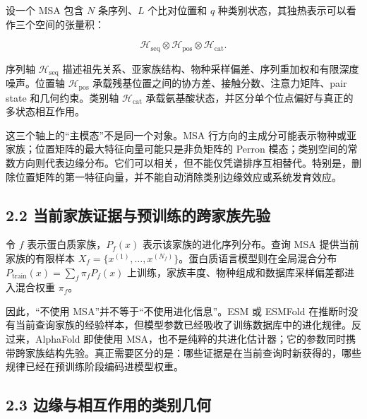 \documentclass[10pt]{article}
\begin{document}

设一个 MSA 包含 \(N\) 条序列、\(L\) 个比对位置和 \(q\) 种类别状态，其独热表示可以看作三个空间的张量积：\par


\begin{equation}
\mathcal H_{\mathrm{seq}}\otimes
\mathcal H_{\mathrm{pos}}\otimes
\mathcal H_{\mathrm{cat}}.
\end{equation}

序列轴 \(\mathcal H_{\mathrm{seq}}\) 描述祖先关系、亚家族结构、物种采样偏差、序列重加权和有限深度噪声。位置轴 \(\mathcal H_{\mathrm{pos}}\) 承载残基位置之间的协方差、接触分数、注意力矩阵、pair state 和几何约束。类别轴 \(\mathcal H_{\mathrm{cat}}\) 承载氨基酸状态，并区分单个位点偏好与真正的多状态相互作用。\par

这三个轴上的“主模态”不是同一个对象。MSA 行方向的主成分可能表示物种或亚家族；位置矩阵的最大特征向量可能只是非负矩阵的 Perron 模态；类别空间的常数方向则代表边缘分布。它们可以相关，但不能仅凭谱排序互相替代。特别是，删除位置矩阵的第一特征向量，并不能自动消除类别边缘效应或系统发育效应。\par

\subsection*{2.2 当前家族证据与预训练的跨家族先验}


令 \(f\) 表示蛋白质家族，\(P_f(x)\) 表示该家族的进化序列分布。查询 MSA 提供当前家族的有限样本 \(X_f=\{x^{(1)},\ldots,x^{(N_f)}\}\)。蛋白质语言模型则在全局混合分布 \(P_{\mathrm{train}}(x)=\sum_f\pi_fP_f(x)\) 上训练，家族丰度、物种组成和数据库采样偏差都进入混合权重 \(\pi_f\)。\par

因此，“不使用 MSA”并不等于“不使用进化信息”。ESM 或 ESMFold 在推断时没有当前查询家族的经验样本，但模型参数已经吸收了训练数据库中的进化规律。反过来，AlphaFold 即使使用 MSA，也不是纯粹的共进化估计器；它的参数同时携带跨家族结构先验。真正需要区分的是：哪些证据是在当前查询时新获得的，哪些规律已经在预训练阶段编码进模型权重。\par

\subsection*{2.3 边缘与相互作用的类别几何}
\end{document}
